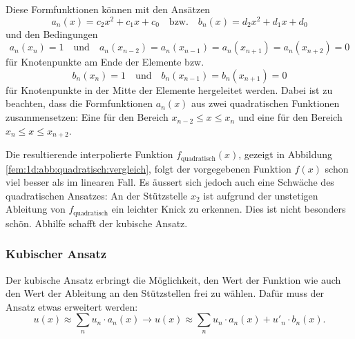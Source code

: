 Diese Formfunktionen können mit den Ansätzen 
\begin{equation}
    a_n(x) = c_2x^2 + c_1x + c_0
    \quad \text{bzw.} \quad
    b_n(x) = d_2x^2 + d_1x + d_0
\end{equation}
und den Bedingungen 
\begin{equation}
    a_n(x_n) = 1 
    \quad \text{und} \quad 
    a_n(x_{n-2}) = a_n(x_{n-1}) = a_n(x_{n+1}) = a_n(x_{n+2}) = 0
\end{equation}
für Knotenpunkte am Ende der Elemente bzw.
\begin{equation}
    b_n(x_n) = 1
    \quad \text{und} \quad 
    b_n(x_{n-1}) = b_n(x_{n+1}) = 0
\end{equation}
für Knotenpunkte in der Mitte der Elemente hergeleitet werden.
Dabei ist zu beachten, dass die Formfunktionen $a_n(x)$ aus zwei quadratischen Funktionen zusammensetzen: 
Eine für den Bereich $x_{n-2} \leq x \leq x_n$ und eine für den Bereich $x_n \leq x \leq x_{n+2}$.

Die resultierende interpolierte Funktion $f_\text{quadratisch} (x)$, gezeigt in Abbildung \ref{fem:1d:abb:quadratisch:vergleich}, folgt der vorgegebenen Funktion $f(x)$ schon viel besser als im linearen Fall.
Es äussert sich jedoch auch eine Schwäche des quadratischen Ansatzes: 
An der Stützstelle $x_2$ ist aufgrund der unstetigen Ableitung von $f_\text{quadratisch}$ ein leichter Knick zu erkennen.
Dies ist nicht besonders schön.
Abhilfe schafft der kubische Ansatz.

\subsubsection{Kubischer Ansatz}

Der kubische Ansatz erbringt die Möglichkeit, den Wert der Funktion wie auch den Wert der Ableitung an den Stützstellen frei zu wählen.
Dafür muss der Ansatz etwas erweitert werden:
\begin{equation}
    u(x) \approx \sum_{n}{u_n \cdot a_n(x)} \rightarrow u(x) \approx \sum_{n}{u_n \cdot a_n(x) + u'_n \cdot b_n(x)}.
\end{equation}

